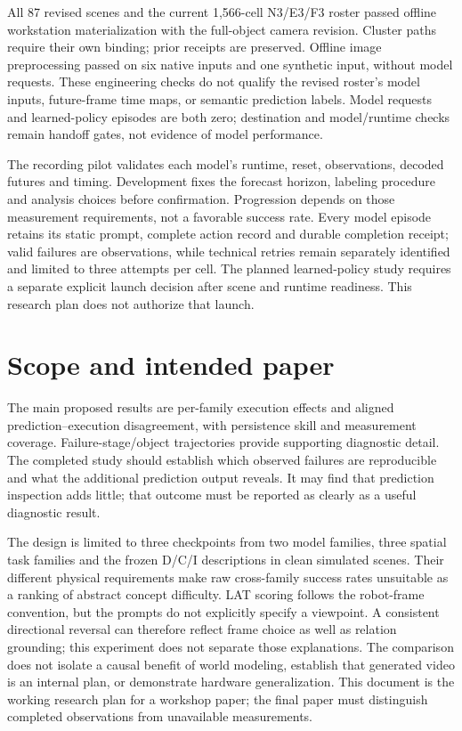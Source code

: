 \documentclass[11pt]{article}
\begin{document}
All 87 revised scenes and the current 1,566-cell N3/E3/F3 roster passed offline workstation materialization with the full-object camera revision. Cluster paths require their own binding; prior receipts are preserved. Offline image preprocessing passed on six native inputs and one synthetic input, without model requests. These engineering checks do not qualify the revised roster's model inputs, future-frame time maps, or semantic prediction labels. Model requests and learned-policy episodes are both zero; destination and model/runtime checks remain handoff gates, not evidence of model performance.

The recording pilot validates each model's runtime, reset, observations, decoded futures and timing. Development fixes the forecast horizon, labeling procedure and analysis choices before confirmation. Progression depends on those measurement requirements, not a favorable success rate. Every model episode retains its static prompt, complete action record and durable completion receipt; valid failures are observations, while technical retries remain separately identified and limited to three attempts per cell. The planned learned-policy study requires a separate explicit launch decision after scene and runtime readiness. This research plan does not authorize that launch.

\section{Scope and intended paper}
The main proposed results are per-family execution effects and aligned prediction--execution disagreement, with persistence skill and measurement coverage. Failure-stage/object trajectories provide supporting diagnostic detail. The completed study should establish which observed failures are reproducible and what the additional prediction output reveals. It may find that prediction inspection adds little; that outcome must be reported as clearly as a useful diagnostic result.

The design is limited to three checkpoints from two model families, three spatial task families and the frozen D/C/I descriptions in clean simulated scenes. Their different physical requirements make raw cross-family success rates unsuitable as a ranking of abstract concept difficulty. LAT scoring follows the robot-frame convention, but the prompts do not explicitly specify a viewpoint. A consistent directional reversal can therefore reflect frame choice as well as relation grounding; this experiment does not separate those explanations. The comparison does not isolate a causal benefit of world modeling, establish that generated video is an internal plan, or demonstrate hardware generalization. This document is the working research plan for a workshop paper; the final paper must distinguish completed observations from unavailable measurements.
\end{document}
